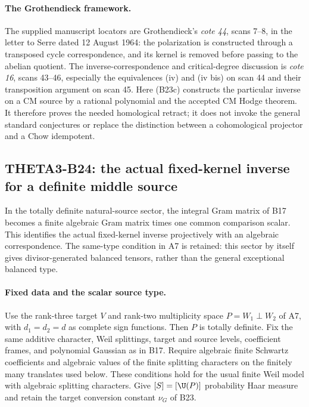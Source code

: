 \documentclass[11pt]{article}
\theoremstyle{definition}\newtheorem{definition}[theorem]{Definition}\newtheorem{remark}[theorem]{Remark}
\begin{document}
\paragraph{The Grothendieck framework.}
The supplied manuscript locators are
Grothendieck's \emph{cote 44}, scans 7--8, in the letter
to Serre dated 12 August 1964: the polarization is
constructed through a transposed cycle correspondence,
and its kernel is removed before passing to the abelian
quotient.  The inverse-correspondence and critical-degree
discussion is \emph{cote 16}, scans 43--46, especially
the equivalences (iv) and (iv bis) on scan 44 and
their transposition argument on scan 45.  Here (B23c)
constructs the particular inverse on a CM source by a
rational polynomial and the accepted CM Hodge theorem.
It therefore proves the needed homological retract;
it does not invoke the general standard conjectures
or replace the distinction between a cohomological
projector and a Chow idempotent.


\subsection{THETA3-B24: the actual fixed-kernel inverse for a definite middle source}\label{B24}

In the totally definite natural-source sector, the integral
Gram matrix of B17 becomes a finite algebraic Gram matrix
times one common comparison scalar.  This identifies the
actual fixed-kernel inverse projectively with an algebraic
correspondence.  The same-type condition in A7 is retained:
this sector by itself gives divisor-generated balanced
tensors, rather than the general exceptional balanced type.

\paragraph{Fixed data and the scalar source type.}
Use the rank-three target $V$ and rank-two multiplicity
space $P=W_1\perp W_2$ of A7, with $d_1=d_2=d$ as
complete sign functions.  Then $P$ is totally definite.
Fix the same additive character, Weil splittings, target
and source levels, coefficient frames, and polynomial
Gaussian as in B17.  Require algebraic finite Schwartz
coefficients and algebraic values of the finite splitting
characters on the finitely many translates used below.
These conditions hold for the usual finite Weil model
with algebraic splitting characters.  Give
$[S]=[\U(P)]$ probability Haar measure and retain the
target conversion constant $\nu_G$ of B23.
\end{document}

